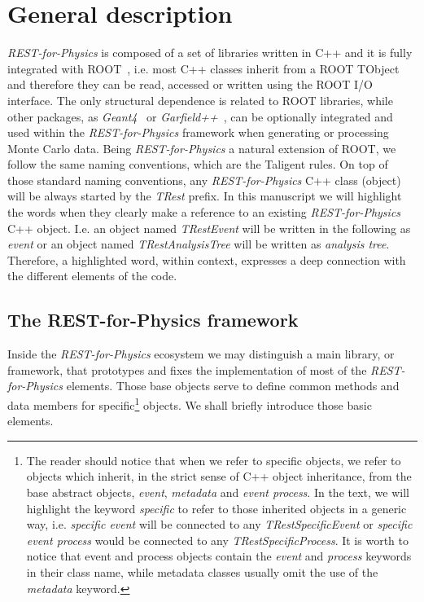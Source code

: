 \section{General description}
\label{sec:framework}



\emph{REST-for-Physics} is composed of a set of libraries written in C++ and it is fully integrated with ROOT~\cite{ROOT,Brun:2011Gp,ROOT2011}, i.e. most C++ classes inherit from a ROOT TObject and therefore they can be read, accessed or written using the ROOT I/O interface. The only structural dependence is related to ROOT libraries, while other packages, as \emph{Geant4}~\cite{Agostinelli:2002hh} or \emph{Garfield++}~\cite{Garfield}, can be optionally integrated and used within the \emph{REST-for-Physics} framework when generating or processing Monte Carlo data. Being \emph{REST-for-Physics} a natural extension of ROOT, we follow the same naming conventions, which are the Taligent rules. On top of those standard naming conventions, any \emph{REST-for-Physics} C++ class (object) will be always started by the \emph{TRest} prefix. In this manuscript we will highlight the words when they clearly make a reference to an existing \emph{REST-for-Physics} C++ object. I.e. an object named \emph{TRestEvent} will be written in the following as \emph{event} or an object named \emph{TRestAnalysisTree} will be written as \emph{analysis tree}. Therefore, a highlighted word, within context, expresses a deep connection with the different elements of the code.

\subsection{The REST-for-Physics framework}
Inside the \emph{REST-for-Physics} ecosystem we may distinguish a main library, or framework, that prototypes and fixes the implementation of most of the \emph{REST-for-Physics} elements. Those base objects serve to define common methods and data members for specific\footnote{The reader should notice that when we refer to specific objects, we refer to objects which inherit, in the strict sense of C++ object inheritance, from the base abstract objects, \emph{event}, \emph{metadata} and \emph{event process}. In the text, we will highlight the keyword \emph{specific} to refer to those inherited objects in a generic way, i.e. \emph{specific event} will be connected to any \emph{TRestSpecificEvent} or \emph{specific event process} would be connected to any \emph{TRestSpecificProcess}. It is worth to notice that event and process objects contain the \emph{event} and \emph{process} keywords in their class name, while metadata classes usually omit the use of the \emph{metadata} keyword. } objects. We shall briefly introduce those basic elements.

